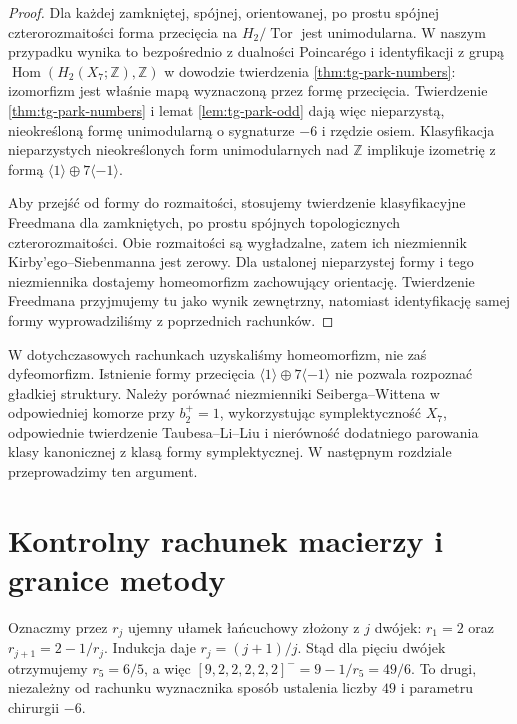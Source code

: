 \begin{proof}
Dla każdej zamkniętej, spójnej, orientowanej, po prostu
spójnej czterorozmaitości forma przecięcia na
$H_2/\operatorname{Tor}$ jest unimodularna.
W naszym przypadku wynika to bezpośrednio z
dualności Poincarégo i identyfikacji z grupą
$\operatorname{Hom}(H_2(X_7;\mathbb Z),\mathbb Z)$
w dowodzie twierdzenia \ref{thm:tg-park-numbers}:
izomorfizm jest właśnie mapą wyznaczoną
przez formę przecięcia.
Twierdzenie \ref{thm:tg-park-numbers} i lemat
\ref{lem:tg-park-odd} dają więc nieparzystą,
nieokreśloną formę unimodularną o sygnaturze $-6$
i rzędzie osiem. Klasyfikacja nieparzystych
nieokreślonych form unimodularnych nad $\mathbb Z$
implikuje izometrię z formą
$\langle1\rangle\oplus7\langle-1\rangle$.

Aby przejść od formy do rozmaitości, stosujemy twierdzenie
klasyfikacyjne Freedmana dla zamkniętych, po prostu
spójnych topologicznych czterorozmaitości.
Obie rozmaitości są wygładzalne, zatem ich niezmiennik
Kirby'ego--Siebenmanna jest zerowy. Dla ustalonej
nieparzystej formy i tego niezmiennika dostajemy
homeomorfizm zachowujący orientację.
Twierdzenie Freedmana przyjmujemy tu jako wynik
zewnętrzny, natomiast identyfikację samej formy
wyprowadziliśmy z poprzednich rachunków.
\end{proof}

\begin{uwaga}
W dotychczasowych rachunkach uzyskaliśmy homeomorfizm,
nie zaś dyfeomorfizm. Istnienie formy przecięcia
$\langle1\rangle\oplus7\langle-1\rangle$ nie pozwala
rozpoznać gładkiej struktury. Należy porównać
niezmienniki Seiberga--Wittena w odpowiedniej komorze
przy $b_2^+=1$, wykorzystując symplektyczność $X_7$,
odpowiednie twierdzenie Taubesa--Li--Liu i nierówność
dodatniego parowania klasy kanonicznej z klasą formy
symplektycznej. W następnym rozdziale przeprowadzimy ten argument.
\end{uwaga}

\section{Kontrolny rachunek macierzy i granice metody}
\label{sec:tg-park-summary}

\begin{przyklad}
Oznaczmy przez $r_j$ ujemny ułamek łańcuchowy
złożony z $j$ dwójek: $r_1=2$ oraz
$r_{j+1}=2-1/r_j$. Indukcja daje
$r_j=(j+1)/j$. Stąd dla pięciu dwójek
otrzymujemy $r_5=6/5$, a więc
$[9,2,2,2,2,2]^-=9-1/r_5=49/6$.
To drugi, niezależny od rachunku wyznacznika sposób
ustalenia liczby $49$ i parametru chirurgii $-6$.
\end{przyklad}

